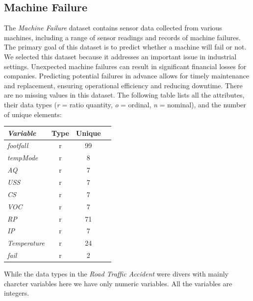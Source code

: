 \documentclass{article}
\begin{document}
\subsection{Machine Failure}
The \textit{Machine Failure} dataset contains sensor data collected from various machines, including a range of sensor readings and records of machine failures. The primary goal of this dataset is to predict whether a machine will fail or not.
We selected this dataset because it addresses an important issue in industrial settings. Unexpected machine failures can result in significant financial losses for companies. Predicting potential failures in advance allows for timely maintenance and replacement, ensuring operational efficiency and reducing downtime.
\noindent There are no missing values in this dataset. The following table lists all the attributes, their data types (\textit{r} = ratio quantity, \textit{o} = ordinal, \textit{n} = nominal), and the number of unique elements:
\setlength{\tabcolsep}{1pt} %
    \begin{table}[H]
        \begin{tabular}{l@{}c@{}c@{}c}
                \textit{\textbf{Variable}} & \textbf{Type} \hspace{0.3em} & \textbf{Unique} \hspace{0.3em} \\\hline
                \textit{footfall } & r & 99 \\
                \textit{tempMode} & r & 8 \\
                \textit{AQ} & r & 7 \\
                \textit{USS} & r & 7 \\
                \textit{CS} & r & 7 \\
                \textit{VOC} & r & 7  \\
                \textit{RP} & r & 71 \\
                \textit{IP} & r & 7 \\
                \textit{Temperature} & r & 24 \\
                \textit{fail} & r & 2 
        \end{tabular}
    \end{table}

While the data types in the \textit{Road Traffic Accident} were divers with mainly charcter variables here we have only numeric variables. All the variables are integers.
\end{document}
